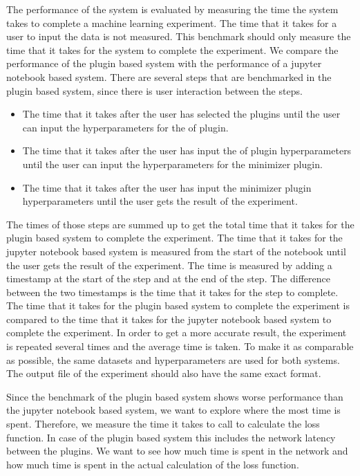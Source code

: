 \documentclass[
  a4paper,  %
  twoside,  %
  bibliography=totoc,
  headsepline,
  cleardoublepage=empty,
  parskip=half,
  draft=false
]{scrbook}
\begin{document}
The performance of the system is evaluated by measuring the time the system takes to complete a machine learning experiment.
The time that it takes for a user to input the data is not measured.
This benchmark should only measure the time that it takes for the system to complete the experiment.
We compare the performance of the plugin based system with the performance of a jupyter notebook based system.
There are several steps that are benchmarked in the plugin based system, since there is user interaction between the steps.
\begin{itemize}
  \item The time that it takes after the user has selected the plugins until the user can input the hyperparameters for the of plugin.
  \item The time that it takes after the user has input the of plugin hyperparameters until the user can input the hyperparameters for the minimizer plugin.
  \item The time that it takes after the user has input the minimizer plugin hyperparameters until the user gets the result of the experiment.
\end{itemize}
The times of those steps are summed up to get the total time that it takes for the plugin based system to complete the experiment.
The time that it takes for the jupyter notebook based system is measured from the start of the notebook until the user gets the result of the experiment.
The time is measured by adding a timestamp at the start of the step and at the end of the step.
The difference between the two timestamps is the time that it takes for the step to complete.
The time that it takes for the plugin based system to complete the experiment is compared to the time that it takes for the jupyter notebook based system to complete the experiment.
In order to get a more accurate result, the experiment is repeated several times and the average time is taken.
To make it as comparable as possible, the same datasets and hyperparameters are used for both systems.
The output file of the experiment should also have the same exact format.

Since the benchmark of the plugin based system shows worse performance than the jupyter notebook based system, we want to explore where the most time is spent.
Therefore, we measure the time it takes to call to calculate the loss function.
In case of the plugin based system this includes the network latency between the plugins.
We want to see how much time is spent in the network and how much time is spent in the actual calculation of the loss function.
\end{document}
